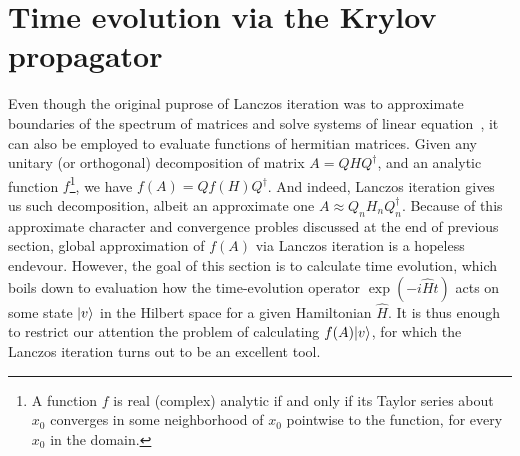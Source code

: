 \section{Time evolution via the Krylov propagator}

Even though the original puprose of Lanczos iteration was to approximate boundaries of the spectrum of matrices and
solve systems of linear equation~\autocite{Simoncini2016,Shewchuk1994a}, it can also be employed to evaluate functions
of hermitian matrices. Given any unitary (or orthogonal) decomposition of matrix \(A = QHQ^{\dagger}\), and an analytic
function \(f\)\footnote{A function \(f\) is real (complex) analytic if and only if its Taylor series about \(x_0\) 
converges in some neighborhood of \(x_0\) pointwise to the function, for every \(x_0\) in the domain.}, we have
\(f(A) = Qf(H)Q^{\dagger}\). And indeed, Lanczos iteration gives us such decomposition, albeit an approximate one
\(A \approx Q_n H_n Q_n^{\dagger}\). Because of this approximate character and convergence probles discussed at
the end of previous section, global approximation of \(f(A)\) via Lanczos iteration is a hopeless endevour.
However, the goal of this section is to calculate time evolution, which boils down to evaluation how the time-evolution
operator \(\exp\left(-i \hat{H} t\right) \) acts on some state \(\ket{v}\) in the Hilbert space for a given
Hamiltonian \(\hat{H}\). It is thus enough to restrict our attention the problem of calculating \(f(A){\ket{v}}\), for
which the Lanczos iteration turns out to be an excellent tool.

